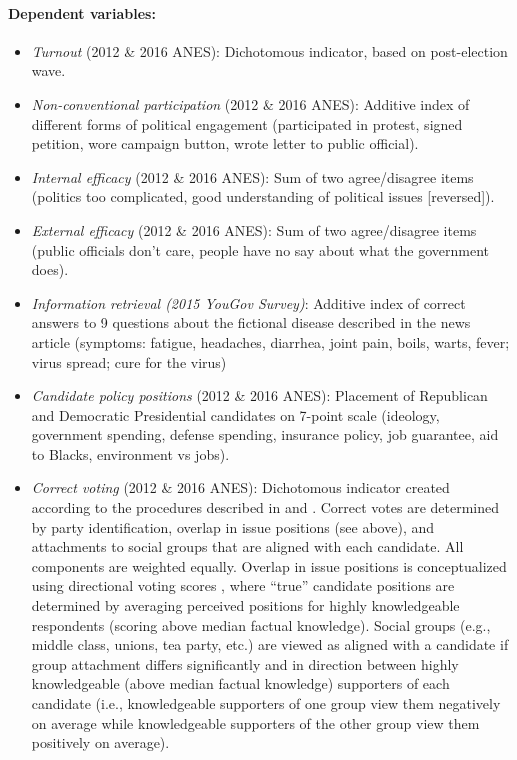 \paragraph{Dependent variables:}
\begin{itemize}[nolistsep]
\item \textit{Turnout} (2012 \& 2016 ANES): Dichotomous indicator, based on post-election wave.
\item \textit{Non-conventional participation} (2012 \& 2016 ANES): Additive index of different forms of political engagement (participated in protest, signed petition, wore campaign button, wrote letter to public official).
\item \textit{Internal efficacy} (2012 \& 2016 ANES): Sum of two agree/disagree items (politics too complicated, good understanding of political issues [reversed]).
\item \textit{External efficacy} (2012 \& 2016 ANES): Sum of two agree/disagree items (public officials don't care, people have no say about what the government does).
\item \textit{Information retrieval (2015 YouGov Survey)}: Additive index of correct answers to 9 questions about the fictional disease described in the news article (symptoms: fatigue, headaches, diarrhea, joint pain, boils, warts, fever; virus spread; cure for the virus)
\item \textit{Candidate policy positions} (2012 \& 2016 ANES): Placement of Republican and Democratic Presidential candidates on 7-point scale (ideology, government spending, defense spending, insurance policy, job guarantee, aid to Blacks, environment vs jobs).
\item \textit{Correct voting} (2012 \& 2016 ANES): Dichotomous indicator created according to the procedures described in \citet{lau1997voting,lau2008exploration} and \citet{sokhey2012social}. Correct votes are determined by party identification, overlap in issue positions (see above), and attachments to social groups that are aligned with each candidate. All components are weighted equally. Overlap in issue positions is conceptualized using directional voting scores \citep{rabinowitz1989directional}, where ``true'' candidate positions are determined by averaging perceived positions for highly knowledgeable respondents (scoring above median factual knowledge). Social groups (e.g., middle class, unions, tea party, etc.) are viewed as aligned with a candidate if group attachment differs significantly and in direction between highly knowledgeable (above median factual knowledge) supporters of each candidate (i.e., knowledgeable supporters of one group view them negatively on average while knowledgeable supporters of the other group view them positively on average).
\end{itemize}


